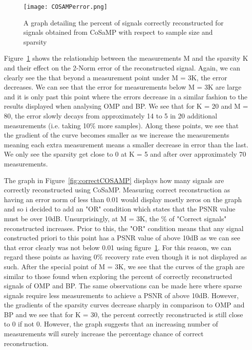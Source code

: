\documentclass[titlepage,oneside, 12pt]{book}
\theoremstyle{break}
\begin{document}
\begin{figure}[h]
\centering
\centerline{\texttt{[image: COSAMPerror.png]}}
\caption{A graph detailing the percent of signals correctly reconstructed for signals obtained from CoSaMP with respect to sample size and sparsity}
\label{fig:errorCOSAMP}
\end{figure}


Figure~\ref{fig:errorCOSAMP} shows the relationship between the measurements M and the sparsity K and their effect on the 2-Norm error of the reconstructed signal. Again, we can clearly see the that beyond a  measurement point under M = 3K, the error decreases. We can see that the error for measurements below M = 3K are large and it is only past this point where the errors decrease in a similar fashion to the results displayed when analysing OMP and BP. We see that for K = 20 and M = 80, the error slowly decays from approximately 14 to 5 in 20 additional measurements (i.e. taking 10\% more samples). Along these points, we see that the gradient of the curve becomes smaller as we increase the measurements meaning each extra measurement means a smaller decrease in error than the last. We only see the sparsity get close to 0 at K = 5 and after over approximately 70 measurements. 
\newpage

The graph in Figure~\ref{fig:correctCOSAMP} displays how many signals are correctly reconstructed using CoSaMP. Measuring correct reconstruction as having an error norm of less than 0.01 would display mostly zeros on the graph and so i decided to add an "OR" condition which states that the PSNR value must be over 10dB. Unsurprisingly, at M = 3K, the \% of "Correct signals" reconstructed increases. Prior to this, the "OR" condition means that any signal constructed priori to this point has a PSNR value of above 10dB as we can see that error clearly was not below 0.01 using figure~\ref{fig:errorCOSAMP}. For this reason, we can regard these points as having 0\% recovery rate even though it is not displayed as such. After the special point of M = 3K, we see that the curves of the graph are similar to those found when exploring the percent of correctly reconstructed signals of OMP and BP. The same observations can be made here where sparse signals require less measurements to achieve a PSNR of above 10dB. However, the gradients of the sparsity curves decrease sharply in comparison to OMP and BP and we see that for K = 30, the percent correctly reconstructed is still close to 0 if not 0. However, the graph suggests that an increasing number of measurements will surely increase the percentage chance of correct reconstruction. 
\end{document}
